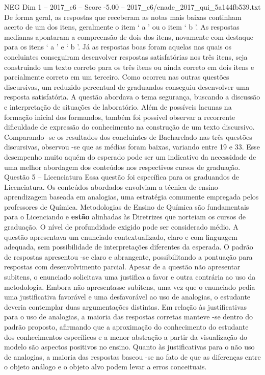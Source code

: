 \begin{textsample}{NEG Dim 1 – 2017\_c6 – Score -5.00 – 2017\_c6/enade\_2017\_qui\_5a144fb539.txt}
De forma geral, as respostas que receberam as notas mais baixas continham acerto de um dos itens, geralmente o item ‘ a ’ ou o item ‘ b ’.
As respostas medianas apontaram a compreensão de dois dos itens, novamente com destaque para os itens ‘ a ’ e ‘ b ’.
Já as respostas boas foram aquelas nas quais os concluintes conseguiram desenvolver respostas satisfatórias nos três itens, seja construindo um texto correto para os três itens ou ainda correto em dois itens e parcialmente correto em um terceiro.
Como ocorreu nas outras questões discursivas, um reduzido percentual de graduandos conseguiu desenvolver uma resposta satisfatória.
A questão abordava o tema segurança, buscando a discussão e interpretação de situações de laboratório.
Além de possíveis lacunas na formação inicial dos formandos, também foi possível observar a recorrente dificuldade de expressão do conhecimento na construção de um texto discursivo.
Comparando -se os resultados dos concluintes de Bacharelado nas três questões discursivas, observou -se que as médias foram baixas, variando entre 19 e 33.
Esse desempenho muito aquém do esperado pode ser um indicativo da necessidade de uma melhor abordagem dos conteúdos nos respectivos cursos de graduação.
Questão 5 – Licenciatura Essa questão foi específica para os graduandos de Licenciatura.
Os conteúdos abordados envolviam a técnica de ensino-aprendizagem baseada em analogias, uma estratégia comumente empregada pelos professores de Química.
Metodologias de Ensino de Química são fundamentais para o Licenciando e \textbf{estão} alinhadas às Diretrizes que norteiam os cursos de graduação.
O nível de profundidade exigido pode ser considerado médio.
A questão apresentava um enunciado contextualizado, claro e com linguagem adequada, sem possibilidade de interpretações diferentes da esperada.
O padrão de respostas apresentou -se claro e abrangente, possibilitando a pontuação para respostas com desenvolvimento parcial.
Apesar de a questão não apresentar subitens, o enunciado solicitava uma justifica a favor e outra contrária ao uso da metodologia.
Embora não apresentasse subitens, uma vez que o enunciado pedia uma justificativa favorável e uma desfavorável ao uso de analogias, o estudante deveria contemplar duas argumentações distintas.
Em relação às justificativas para o uso de analogias, a maioria das respostas corretas manteve -se dentro do padrão proposto, afirmando que a aproximação do conhecimento do estudante dos conhecimentos específicos e a menor abstração a partir da visualização do modelo são aspectos positivos no ensino.
Quanto às justificativas para o não uso de analogias, a maioria das respostas baseou -se no fato de que as diferenças entre o objeto análogo e o objeto alvo podem levar a erros conceituais.

\end{textsample}
